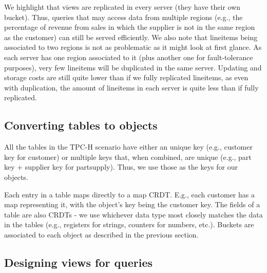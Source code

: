 \documentclass{vldb}
\newcommand{\grumbler}[2]{{\color{red}{\bf #1:} #2}}
\renewcommand{\grumbler}[2]{}
\newcommand{\andre}[1]{\grumbler{andre}{#1}}
\begin{document}
We highlight that views are replicated in every server (they have their own bucket).
Thus, queries that may access data from multiple regions (e.g., the percentage of revenue from sales in which the supplier is not in the same region as the customer) can still be served efficiently.
We also note that lineitems being associated to two regions is not as problematic as it might look at first glance.
As each server has one region associated to it (plus another one for fault-tolerance purposes), very few lineitems will be duplicated in the same server.
Updating and storage costs are still quite lower than if we fully replicated lineitems, as even with duplication, the amount of lineitems in each server is quite less than if fully replicated.

\andre{One detail which I did not mention, as I think it might be confusing at this point - if we have some view that may be triggered by some new/deleted/updated lineitem, we can deterministally choose, e.g., to only generate a view update for the bucket of the supplier's region. That is, duplicated view updates are not possible even with duplicated lineitems.}
	
\subsection{Converting tables to objects}

\andre{Note: I'd expect to many others having done this to test key-value DBs. Should I refer any of those? If so, any paper suggestions are welcome :)}

All the tables in the TPC-H scenario have either an unique key (e.g., customer key for customer) or multiple keys that, when combined, are unique (e.g., part key + supplier key for partsupply).
Thus, we use those as the keys for our objects.

Each entry in a table maps directly to a map CRDT. E.g., each customer has a map representing it, with the object's key being the customer key.
The fields of a table are also CRDTs - we use whichever data type most closely matches the data in the tables (e.g., registers for strings, counters for numbers, etc.).
Buckets are associated to each object as described in the previous section.

\subsection{Designing views for queries}

\andre{I don't think this introdutory text is good - I need some help here.}
\end{document}
